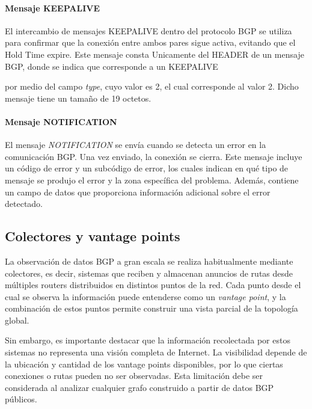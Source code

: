 \paragraph{Mensaje KEEPALIVE} 

El intercambio de mensajes KEEPALIVE dentro del protocolo BGP se utiliza para confirmar que la conexión 
entre ambos pares sigue activa, evitando que el Hold Time expire.
Este mensaje consta Unicamente del HEADER de un mensaje BGP, donde se indica que corresponde a un KEEPALIVE 

por medio del campo \textit{type}, cuyo valor es 2, el cual corresponde al valor 2. Dicho mensaje tiene un 
tamaño de 19 octetos.\\


\paragraph{Mensaje NOTIFICATION}

El mensaje \textit{NOTIFICATION} se envía cuando se detecta un error en la comunicación BGP. Una vez enviado, la conexión se cierra.
Este mensaje incluye un código de error y un subcódigo de error, los cuales indican en qué tipo de mensaje se produjo el error y la zona específica del problema. 
Además, contiene un campo de datos que proporciona información adicional sobre el error detectado.\\




\subsection{Colectores y vantage points}


La observación de datos BGP a gran escala se realiza habitualmente mediante colectores, es decir, sistemas que reciben y almacenan anuncios de rutas desde múltiples routers distribuidos en distintos puntos de la red. Cada punto desde el cual se observa la información puede entenderse como un \textit{vantage point}, y la combinación de estos puntos permite construir una vista parcial de la topología global.

Sin embargo, es importante destacar que la información recolectada por estos sistemas no representa una visión completa de Internet. La visibilidad depende de la ubicación y cantidad de los vantage points disponibles, por lo que ciertas conexiones o rutas pueden no ser observadas. Esta limitación debe ser considerada al analizar cualquier grafo construido a partir de datos BGP públicos.



